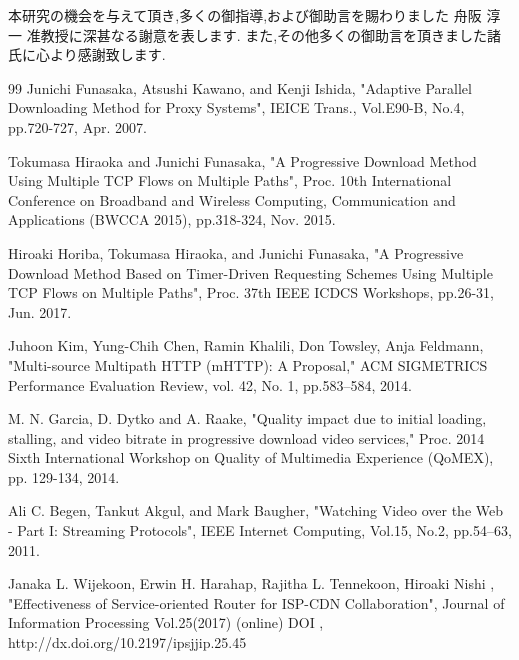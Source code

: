 \documentclass[a4j,12pt]{gradthesis_utf8}
\begin{document}
\clearpage
%
\begin{acknowledgment}
 本研究の機会を与えて頂き,多くの御指導,および御助言を賜わりました
舟阪 淳一 准教授に深甚なる謝意を表します.
また,その他多くの御助言を頂きました諸氏に心より感謝致します.
\end{acknowledgment}
\begin{flushleft}
\begin {thebibliography}{99} 
Junichi Funasaka, Atsushi Kawano, and Kenji Ishida, "Adaptive Parallel Downloading Method for Proxy Systems", IEICE Trans., Vol.E90-B, No.4, pp.720-727, Apr. 2007.

Tokumasa Hiraoka and Junichi Funasaka, "A Progressive Download Method Using Multiple TCP Flows on Multiple Paths", Proc. 10th International Conference on Broadband and Wireless Computing, Communication and Applications (BWCCA 2015), pp.318-324, Nov. 2015. 

Hiroaki Horiba, Tokumasa Hiraoka, and Junichi Funasaka, "A Progressive Download Method Based on Timer-Driven Requesting Schemes Using Multiple TCP Flows on Multiple Paths", Proc. 37th IEEE ICDCS Workshops, pp.26-31, Jun. 2017.

Juhoon Kim, Yung-Chih Chen, Ramin Khalili, Don Towsley, Anja Feldmann,
"Multi-source Multipath HTTP (mHTTP): A Proposal,"
ACM SIGMETRICS Performance Evaluation Review, vol. 42, No. 1, pp.583--584, 2014.

M. N. Garcia, D. Dytko and A. Raake, "Quality impact due to initial loading, stalling, and video bitrate in progressive download video services," Proc. 2014 Sixth International Workshop on Quality of Multimedia Experience (QoMEX), pp. 129-134, 2014.

Ali C. Begen, Tankut Akgul, and Mark Baugher, "Watching Video over the Web - Part I: Streaming Protocols", IEEE Internet Computing, Vol.15, No.2, pp.54--63, 2011.

Janaka L. Wijekoon, Erwin H. Harahap, Rajitha L. Tennekoon, Hiroaki Nishi
, "Effectiveness of Service-oriented Router for ISP-CDN Collaboration", Journal of Information Processing Vol.25(2017) (online) DOI , http://dx.doi.org/10.2197/ipsjjip.25.45 


\end{thebibliography}
\end{flushleft}
\end{document}
